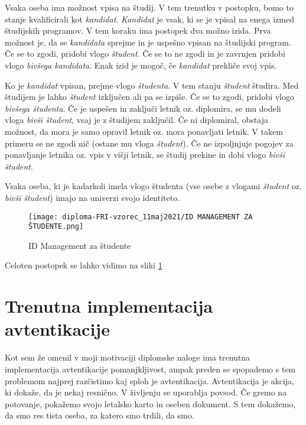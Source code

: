 \documentclass[a4paper,12pt,openright]{book}
\begin{document}
Vsaka oseba ima možnost vpisa na študij. V tem trenutku v postopku, bomo to stanje kvalificirali kot \emph{kandidat}. \emph{Kandidat}  je vsak, ki se je vpisal na enega izmed študijskih programov. V tem koraku ima postopek dva možno izida. Prva možnost je, da se \emph{kandidata} sprejme in je uspešno vpisan na študijski program. Če se to zgodi, pridobi vlogo \emph{študent}. Če se to ne zgodi in je zavrnjen pridobi vlogo \emph{ bivšega kandidata}. Enak izid je mogoč, če \emph{kandidat} prekliče svoj vpis. \newline

Ko je \emph{kandidat} vpisan, prejme vlogo \emph{študenta}. V tem stanju \emph{študent} študira. Med študijem je lahko \emph{študent} izključen ali pa se izpiše. Če se to zgodi, pridobi vlogo \emph{bivšega študenta}. Če je uspešen in zaključi letnik oz. diplomira, se mu dodeli vloga \emph{bivši študent}, vsaj je z študijem zaključil. Če ni diplomiral, obstaja možnost, da mora je samo opravil letnik oz. mora ponavljati letnik. V takem primeru se ne zgodi nič (ostane mu vloga \emph{študent}). Če ne izpoljnjuje pogojev za ponavljanje letnika oz. vpis v višji letnik, se študij prekine in dobi vlogo \emph{bivši študent}.

Vsaka oseba, ki je kadarkoli imela vlogo študenta (vse osebe z vlogami \emph{študent} oz. \emph{bivši študent}) imajo na univerzi svojo identiteto. 

\begin{figure}[]
\texttt{[image: diploma-FRI-vzorec\_11maj2021/ID MANAGEMENT ZA ŠTUDENTE.png]}
\caption{ID Management za študente}
\label{fig:student}
\end{figure}

Celoten postopek se lahko vidimo na sliki \ref{fig:student}

\section{Trenutna implementacija avtentikacije}

Kot sem že omenil v moji motivaciji diplomske naloge ima trenutna implementacija avtentikacije pomanjkljivost, ampak preden se spopademo s tem problemom najprej razčistimo kaj sploh je avtentikacija. 
\newline 
Avtentikacija je akcija, ki dokaže, da je nekaj resnično. V življenju se uporablja povsod. Če gremo na potovanje, pokažemo svojo letalsko karto in oseben dokument. S tem dokažemo, da smo res tista oseba, za katero smo trdili, da smo. 
\newline
\end{document}
